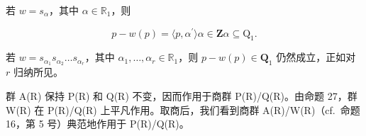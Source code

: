 若 \(w = s_{\alpha}\)，其中 \(\alpha \in \mathbb{R}_1\)，则

\[
p - w (p) = \langle p, \alpha^ {\prime} \rangle \alpha \in \mathbf {Z} \alpha \subseteq \mathrm{Q} _ {1}.
\]

若 \(w = s_{\alpha_1}s_{\alpha_2}\ldots s_{\alpha_r}\)，其中 \(\alpha_{1},\ldots ,\alpha_{r}\in \mathbb{R}_{1}\)，则 \(p - w(p)\in \mathbf{Q}_1\) 仍然成立，正如对 \(r\) 归纳所见。

群 A(R) 保持 P(R) 和 Q(R) 不变，因而作用于商群 P(R)/Q(R)。由命题 27，群 W(R) 在 P(R)/Q(R) 上平凡作用。取商后，我们看到商群 A(R)/W(R)（cf.~命题 16，第 5 号）典范地作用于 P(R)/Q(R)。


